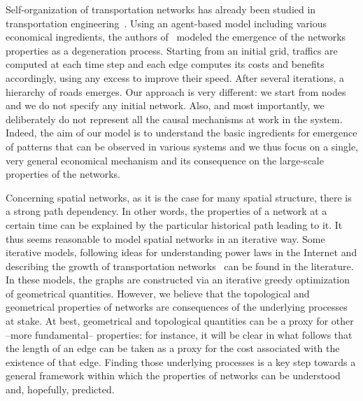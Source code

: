 Self-organization of transportation networks has already been studied in transportation engineering~\cite{Levinson:2006, Xie:2009}. Using an agent-based model including various economical ingredients, the authors of~\cite{Levinson:2006} modeled the emergence of the networks properties as a degeneration process. Starting from an initial grid, traffics are computed at each time step and each edge computes its costs and benefits accordingly, using any excess to improve their speed. After several iterations, a hierarchy of roads emerges. Our approach is very different: we start from nodes and we do not specify any initial network. Also, and most importantly, we deliberately do not represent all the causal mechanisms at work in the system. Indeed, the aim of our model is to understand the basic ingredients for emergence of patterns that can be observed in various systems and we thus focus on a single, very general economical mechanism and its consequence on the large-scale properties of the networks.

Concerning spatial networks, as it is the case for many spatial structure, there is a strong path dependency. In other words, the properties of a network at a certain time can be explained by the particular historical path leading to it. It thus seems reasonable to model spatial networks in an iterative way. Some iterative models, following ideas for understanding power laws in the Internet \cite{Fabrikant:2002} and describing the growth of transportation networks~\cite{Gastner:2006} can be found in the literature. In these models, the graphs are constructed via an iterative greedy optimization of geometrical quantities. However, we believe that the topological and geometrical properties of networks are consequences of the underlying processes at stake. At best, geometrical and topological quantities can be a proxy for other --more fundamental-- properties: for instance, it will be clear in what follows that the length of an edge can be taken as a proxy for the cost associated with the existence of that edge. Finding those underlying processes is a key step towards a general framework within which the properties of networks can be understood and, hopefully, predicted.

